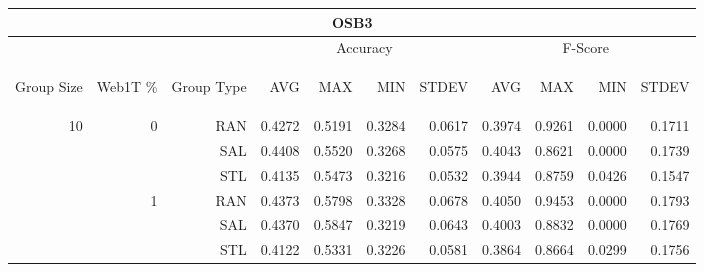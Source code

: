 \begin{center}
\begin{table}[htbp]
\begin{tabular}{ | r | r | r | r | r | r | r | r | r | r | r |}
\hline
\multicolumn{11}{|c|}{OSB3}\\
\hline
 & & & \multicolumn{4}{|c|}{Accuracy} & \multicolumn{4}{|c|}{F-Score}\\ \cline{4-11}
\begin{sideways}Group Size\end{sideways} & \begin{sideways}Web1T \%\end{sideways} & \begin{sideways}Group Type\end{sideways} & \begin{sideways}AVG\end{sideways} & \begin{sideways}MAX\end{sideways} & \begin{sideways}MIN\end{sideways} & \begin{sideways}STDEV\end{sideways} & \begin{sideways}AVG\end{sideways} & \begin{sideways}MAX\end{sideways} & \begin{sideways}MIN\end{sideways} & \begin{sideways}STDEV\end{sideways}\\
\hline
\multirow{15}{*}{10}
 & \multirow{3}{*}{0} & RAN & 0.4272 & 0.5191 & 0.3284 & 0.0617 & 0.3974 & 0.9261 & 0.0000 & 0.1711\\ \cline{3-11}
 &   & SAL & 0.4408 & 0.5520 & 0.3268 & 0.0575 & 0.4043 & 0.8621 & 0.0000 & 0.1739\\ \cline{3-11}
 &   & STL & 0.4135 & 0.5473 & 0.3216 & 0.0532 & 0.3944 & 0.8759 & 0.0426 & 0.1547\\ \cline{2-11}
 & \multirow{3}{*}{1} & RAN & 0.4373 & 0.5798 & 0.3328 & 0.0678 & 0.4050 & 0.9453 & 0.0000 & 0.1793\\ \cline{3-11}
 &   & SAL & 0.4370 & 0.5847 & 0.3219 & 0.0643 & 0.4003 & 0.8832 & 0.0000 & 0.1769\\ \cline{3-11}
 &   & STL & 0.4122 & 0.5331 & 0.3226 & 0.0581 & 0.3864 & 0.8664 & 0.0299 & 0.1756\\ \cline{2-11}

\end{tabular}
\end{table}
\end{center}
